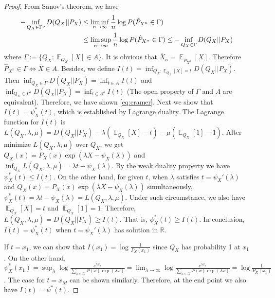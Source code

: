 \documentclass{article}
\DeclareMathOperator{\E}{\mathbb{E}}
\begin{document}
\begin{proof}
From Sanov's theorem, we have
\begin{align}
    -\inf_{Q_X \in \Gamma^o} D(Q_X || P_X)
    &\leq 
    \liminf_{n\to\infty} \frac{1}{n}
    \log P(\hat{P}_{X^n} \in \Gamma)
   \label{eq:sanov} \\ &\leq 
    \limsup_{n\to\infty} \frac{1}{n}
    \log P(\hat{P}_{X^n} \in \Gamma)
    \leq -\inf_{Q_X \in \Gamma} D(Q_X || P_X)\notag
\end{align}
where $\Gamma:=\{Q_{X}:\E_{Q_{X}}[X] \in A \}$.
It is obvious that $\bar{X}_n=\E_{\hat{P}_{X^n}}[X]$. Therefore
$\hat{P}_{X^n} \in \Gamma \iff \bar{X} \in A$. Besides, we define $I(t)=\inf_{Q_X:\E_{Q_X}[X]=t}D(Q_X||P_X)$.
Then $\inf_{Q_X \in \Gamma} D(Q_X || P_X)=
\inf_{t \in A}I(t)$
and $\inf_{Q_X \in \Gamma^o} D(Q_X || P_X)=
\inf_{t \in A^o}I(t)$ (The open property
of $\Gamma$ and $A$ are equivalent).
Therefore, we have shown
\eqref{eq:cramer}.
Next we show that $I(t)=\psi_X^*(t)$,
which is established by Lagrange duality.
The Lagrange function for $I(t)$
is $L(Q_X,\lambda,\mu) = D(Q_X||P_X) - \lambda(\E_{Q_X}[X]-t) - \mu(\E_{Q_X}[1]-1)$. After minimize
$L(Q_X,\lambda,\mu)$ over $Q_X$, we get
$Q_X(x)=P_X(x) \exp(\lambda X - \psi_X(\lambda))$ and $\inf_{Q_X} L(Q_X, \lambda, \mu) = \lambda t-\psi_X(\lambda)$. By the weak duality property we have $\psi_X^*(t) \leq I(t)$.
On the other hand, for given $t$, when $\lambda$ satisfies $t=\psi_X'(\lambda)$
and $Q_X(x)=P_X(x) \exp(\lambda X - \psi_X(\lambda))$ simultaneously,
$\psi_X^*(t) = \lambda t - \psi_X(\lambda) = L(Q_X,\lambda,\mu)$. Under such circumstance, we also have $\E_{Q_X}[X]=t$ and $\E_{Q_X}[1]=1$. Therefore,
$L(Q_X,\lambda,\mu) = D(Q_X||P_X) \geq I(t)$. That is, $\psi_X^*(t) \geq I(t)$.
In conclusion, $I(t)=\psi_X^*(t)$
when $t=\psi_X'(\lambda)$ has solution
in $\mathbb{R}$.

If $t=x_1$, we can
show that $I(x_1)= \log \frac{1}{P_X(x_1)}$
since $Q_X$ has probability 1 at $x_1$.
On the other hand, $\psi_X^*(x_1)=\sup_{\lambda} \log \frac{e^{\lambda x_1}}{\sum_{x\in \mathcal{X}} P(x)\exp(\lambda x) }
=\lim_{\lambda\to \infty} \log \frac{e^{\lambda x_1}}{\sum_{x\in \mathcal{X}} P(x)\exp(\lambda x) }=\log\frac{1}{P_X(x_1)}$. The case for
$t=x_{M}$ can be shown similarly.
Therefore, at the end point we also have
$I(t)=\psi^*(t)$.
\end{proof}
\end{document}

